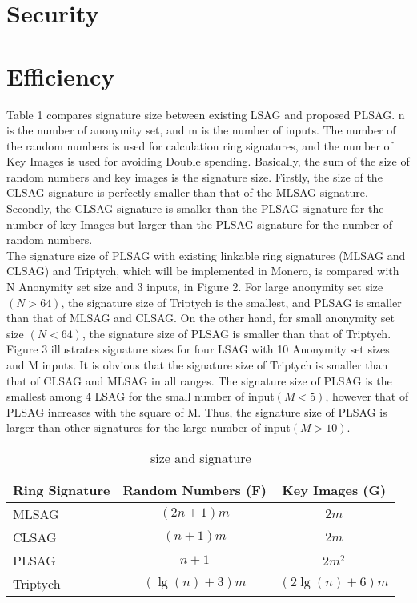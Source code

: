 \documentclass[letterpaper,10pt]{article}
\begin{document}
\section{Security}

\section{Efficiency}
Table 1 compares signature size between existing LSAG and proposed PLSAG. 
n is the number of anonymity set, and m is the number of inputs.
The number of the random numbers is used for calculation ring signatures, and the number of Key Images is used for avoiding Double spending.
Basically, the sum of the size of random numbers and key images is the signature size.
Firstly, the size of the CLSAG signature is perfectly smaller than that of the MLSAG signature.
Secondly, the CLSAG signature is smaller than the PLSAG signature for the number of key Images but larger than the PLSAG signature for the number of random numbers.\\
\quad The signature size of PLSAG with existing linkable ring signatures (MLSAG and CLSAG) and Triptych, which will be implemented in Monero, is compared with N Anonymity set size and 3 inputs, in Figure 2.
For large anonymity set size $(N>64)$, the signature size of Triptych is the smallest, and PLSAG is smaller than that of MLSAG and CLSAG.
On the other hand, for small anonymity set size $(N<64)$, the signature size of PLSAG is smaller than that of Triptych.\\
\quad Figure 3 illustrates signature sizes for four LSAG with 10 Anonymity set sizes and M inputs.
It is obvious that the signature size of Triptych is smaller than that of CLSAG and MLSAG in all ranges.
The signature size of PLSAG is the smallest among 4 LSAG for the small number of input$(M<5)$, however that of PLSAG increases with the square of M.
Thus, the signature size of PLSAG is larger than other signatures for the large number of input$(M>10)$.

\begin{table}[hbtp]  %
  \caption{size and signature}
  \label{table:data_type}
  \centering
  \begin{tabular}{|l|cc|}
    \hline
    Ring Signature  & Random Numbers (F) &  Key Images (G) \\
    \hline
    MLSAG  & $(2n+1)m$  & $2m$ \\
    CLSAG  & $(n+1)m$   & $2m$ \\
    PLSAG  & $n+1$  & $2m^2$ \\
    Triptych  & $(\lg (n)+3)m$   &  $(2\lg (n)+6)m$ \\
    \hline
  \end{tabular}
\end{table}
\end{document}
